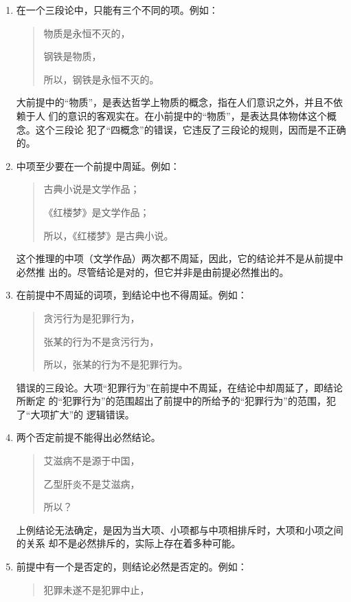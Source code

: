 \documentclass[final,oneside]{ctexbook}
\newenvironment{equotation}{\begin{quotation}\kaishu}{\end{quotation}}
\begin{document}
\begin{enumerate}
  \item 在一个三段论中，只能有三个不同的项。例如：
    \begin{equotation}
      物质是永恒不灭的，

      钢铁是物质，

      所以，钢铁是永恒不灭的。
    \end{equotation}
    大前提中的“物质”，是表达哲学上物质的概念，指在人们意识之外，并且不依赖于人
    们的意识的客观实在。在小前提中的“物质”，是表达具体物体这个概念。这个三段论
    犯了“四概念”的错误，它违反了三段论的规则，因而是不正确的。

  \item 中项至少要在一个前提中周延。例如：
    \begin{equotation}
      古典小说是文学作品；

      《红楼梦》是文学作品；

      所以，《红楼梦》是古典小说。
    \end{equotation}
    这个推理的中项（文学作品）两次都不周延，因此，它的结论并不是从前提中必然推
    出的。尽管结论是对的，但它并非是由前提必然推出的。

  \item 在前提中不周延的词项，到结论中也不得周延。例如：
    \begin{equotation}
      贪污行为是犯罪行为，

      张某的行为不是贪污行为，

      所以，张某的行为不是犯罪行为。
    \end{equotation}
    错误的三段论。大项“犯罪行为”在前提中不周延，在结论中却周延了，即结论所断定
    的“犯罪行为”的范围超出了前提中的所给予的“犯罪行为”的范围，犯了“大项扩大”的
    逻辑错误。

  \item 两个否定前提不能得出必然结论。
    \begin{equotation}
      艾滋病不是源于中国，

      乙型肝炎不是艾滋病，

      所以？
    \end{equotation}
    上例结论无法确定，是因为当大项、小项都与中项相排斥时，大项和小项之间的关系
    却不是必然排斥的，实际上存在着多种可能。

  \item 前提中有一个是否定的，则结论必然是否定的。例如：
    \begin{equotation}
      犯罪未遂不是犯罪中止，


\end{equotation}
\end{enumerate}
\end{document}
